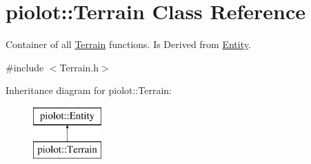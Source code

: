 \hypertarget{classpiolot_1_1_terrain}{}\section{piolot\+:\+:Terrain Class Reference}
\label{classpiolot_1_1_terrain}


Container of all \mbox{\hyperlink{classpiolot_1_1_terrain}{Terrain}} functions. Is Derived from \mbox{\hyperlink{classpiolot_1_1_entity}{Entity}}.  




{\ttfamily \#include $<$Terrain.\+h$>$}

Inheritance diagram for piolot\+:\+:Terrain\+:\begin{figure}[H]
\begin{center}
\leavevmode
\includegraphics[height=2.000000cm]{classpiolot_1_1_terrain}
\end{center}
\end{figure}

